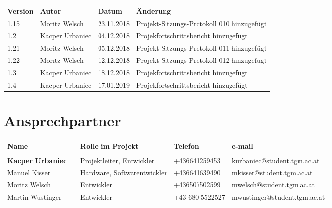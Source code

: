 \newpage
\begin{center}
\begin{tabularx}{\textwidth}{| l | p{1.8cm} | l | X |}
\hline \rowcolor{gray} \textbf{\color{white}Version} & \textbf{\color{white}Autor} & \textbf{\color{white}Datum} &  \textbf{\color{white}Änderung} \\ 
 \hline \hline
 1.15 & Moritz Welsch & 23.11.2018 & Projekt-Sitzungs-Protokoll 010 hinzugefügt\\
 \hline
 1.2 & Kacper Urbaniec & 04.12.2018 & Projekfortschrittsbericht hinzugefügt\\
 \hline
  1.21 & Moritz Welsch & 05.12.2018 & Projekt-Sitzungs-Protokoll 011 hinzugefügt\\
 \hline
  1.22 & Moritz Welsch & 12.12.2018 & Projekt-Sitzungs-Protokoll 012 hinzugefügt\\
 \hline
 1.3 & Kacper Urbaniec & 18.12.2018 & Projekfortschrittsbericht hinzugefügt\\
 \hline
 1.4 & Kacper Urbaniec & 17.01.2019 & Projekfortschrittsbericht hinzugefügt\\
 \hline
\end{tabularx}
\end{center}

\newpage
\section*{Ansprechpartner}

\begin{scriptsize}
\begin{center}
\begin{tabularx}{\textwidth}{| l | l | X | l | l |}
\hline {} \textbf{\color{white} \small Name} &  & \textbf{\color{white} \small Rolle im Projekt} & \textbf{\color{white} \small Telefon} & \textbf{\color{white} \small e-mail} \\ 
 &  & & & \\
 \hline \hline
  \textbf{Kacper Urbaniec} &  & Projektleiter, Entwickler & +436641259453 &  \tiny kurbaniec@student.tgm.ac.at\\
 \hline  
 Manuel Kisser & & Hardware, Softwarentwickler& +436641639490 & \tiny mkisser@student.tgm.ac.at \\
 \hline  
 Moritz Welsch &  & Entwickler & +436507502599 & \tiny mwelsch@student.tgm.ac.at \\
 \hline  
 Martin Wustinger & & Entwickler & +43 680 5522527 & \tiny mwustinger@student.tgm.ac.at \\
 \hline
\end{tabularx}
\end{center}
\end{scriptsize}
\newpage



